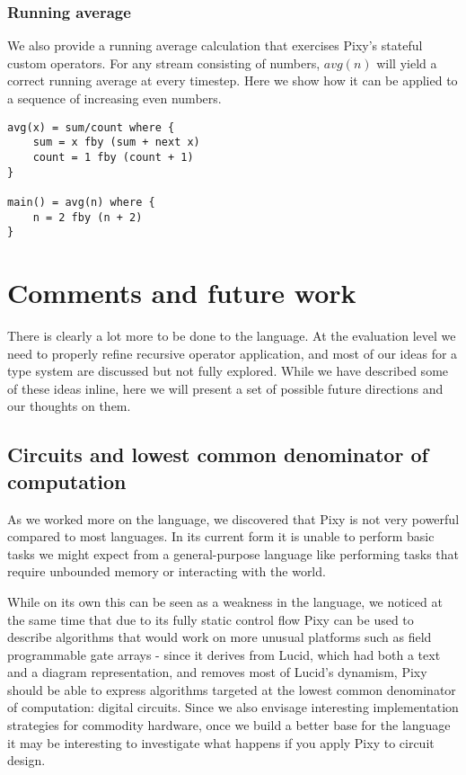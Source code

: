 \documentclass{scrartcl}
\begin{document}
    \subsubsection{Running average}
    
    We also provide a running average calculation that exercises Pixy's stateful custom operators. For any stream consisting of numbers, $avg(n)$ will yield a correct running average at every timestep. Here we show how it can be applied to a sequence of increasing even numbers.
    
    \begin{lstlisting}
avg(x) = sum/count where {
    sum = x fby (sum + next x)
    count = 1 fby (count + 1)
}

main() = avg(n) where {
    n = 2 fby (n + 2)
}
    \end{lstlisting}

    \section{Comments and future work}
    
    There is clearly a lot more to be done to the language. At the evaluation level we need to properly refine recursive operator application, and most of our ideas for a type system are discussed but not fully explored. While we have described some of these ideas inline, here we will present a set of possible future directions and our thoughts on them.
    
    \subsection{Circuits and lowest common denominator of computation}
    
    As we worked more on the language, we discovered that Pixy is not very powerful compared to most languages. In its current form it is unable to perform basic tasks we might expect from a general-purpose language like performing tasks that require unbounded memory or interacting with the world.
    
    While on its own this can be seen as a weakness in the language, we noticed at the same time that due to its fully static control flow Pixy can be used to describe algorithms that would work on more unusual platforms such as field programmable gate arrays - since it derives from Lucid, which had both a text and a diagram representation, and removes most of Lucid's dynamism, Pixy should be able to express algorithms targeted at the lowest common denominator of computation: digital circuits. Since we also envisage interesting implementation strategies for commodity hardware, once we build a better base for the language it may be interesting to investigate what happens if you apply Pixy to circuit design.
    
\end{document}
